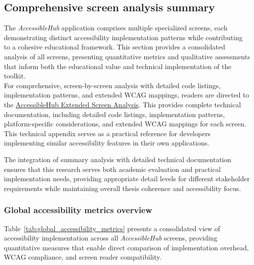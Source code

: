 \FloatBarrier 

\subsection{Comprehensive screen analysis summary}
\label{subsec:comprehensive-screen-analysis}

The \textit{AccessibleHub} application comprises multiple specialized screens, each demonstrating distinct accessibility implementation patterns while contributing to a cohesive educational framework. This section provides a consolidated analysis of all screens, presenting quantitative metrics and qualitative assessments that inform both the educational value and technical implementation of the toolkit. \\

For comprehensive, screen-by-screen analysis with detailed code listings, implementation patterns, and extended WCAG mappings, readers are directed to the \href{https://github.com/gabrielrovesti/AccessibleHub/blob/main/Technical\%20Thesis\%20Appendix/AccessibleHub\%20-\%20Extended\%20screen\%20analysis.pdf}{AccessibleHub Extended Screen Analysis}.
This provides complete technical documentation, including detailed code listings, implementation patterns, platform-specific considerations, and extended WCAG mappings for each screen. This technical appendix serves as a practical reference for developers implementing similar accessibility features in their own applications.

The integration of summary analysis with detailed technical documentation ensures that this research serves both academic evaluation and practical implementation needs, providing appropriate detail levels for different stakeholder requirements while maintaining overall thesis coherence and accessibility focus.

\subsubsection{Global accessibility metrics overview}
\label{subsubsec:global-metrics-overview}

Table~\ref{tab:global_accessibility_metrics} presents a consolidated view of accessibility implementation across all \textit{AccessibleHub} screens, providing quantitative measures that enable direct comparison of implementation overhead, WCAG compliance, and screen reader compatibility.

